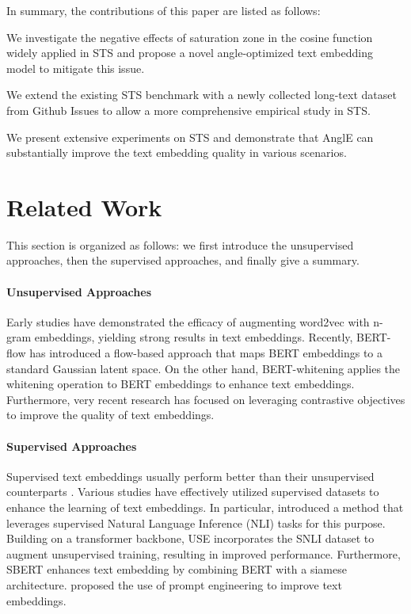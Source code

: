 \documentclass{article} \usepackage{iclr2024_conference,times}
\begin{document}
In summary, the contributions of this paper are listed as follows: 

 We investigate the negative effects of saturation zone in the cosine function widely applied in STS and propose a novel angle-optimized text embedding model to mitigate this issue.

 We extend the existing STS benchmark with a newly collected long-text dataset from Github Issues to allow a more comprehensive empirical study in STS.

 We present extensive experiments on STS and demonstrate that AnglE can substantially improve the text embedding quality in various scenarios.




\section{Related Work}
This section is organized as follows: we first introduce the unsupervised approaches, then the supervised approaches, and finally give a summary.

\paragraph{Unsupervised Approaches} Early studies \citep{DBLP:conf/naacl/HillCK16,pagliardini-etal-2018-unsupervised} have demonstrated the efficacy of augmenting word2vec \citep{word2vec_mikolov_2013} with n-gram embeddings, yielding strong results in text embeddings.
Recently, BERT-flow \citep{li-etal-2020-sentence} has introduced a flow-based approach that maps BERT embeddings to a standard Gaussian latent space. On the other hand, BERT-whitening \citep{su2021whitening} applies the whitening operation to BERT embeddings to enhance text embeddings.
Furthermore, very recent research \citep{carlsson2020semantic, zhang-etal-2020-unsupervised, giorgi-etal-2021-declutr, simcse_gao_2021, consert_yan_2021, chuang-etal-2022-diffcse, promcse_jiang_2022, zhuo-etal-2023-whitenedcse} has focused on leveraging contrastive objectives to improve the quality of text embeddings.

\paragraph{Supervised Approaches} Supervised text embeddings usually perform better than their unsupervised counterparts \citep{simcse_gao_2021}. Various studies have effectively utilized supervised datasets to enhance the learning of text embeddings. In particular, \citet{conneau-etal-2017-supervised} introduced a method that leverages supervised Natural Language Inference (NLI) tasks for this purpose. Building on a transformer backbone, USE \citep{cer-etal-2018-universal} incorporates the SNLI dataset to augment unsupervised training, resulting in improved performance. Furthermore, SBERT \citep{sbert-nils-2019} enhances text embedding by combining BERT with a siamese architecture. \citet{jiang-etal-2022-promptbert,jiang2023scaling} proposed the use of prompt engineering to improve text embeddings.
\end{document}
